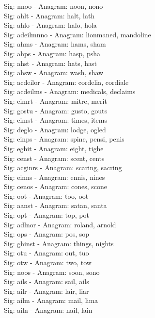 Sig: {nnoo} - Anagram: noon, nono \\
Sig: {ahlt} - Anagram: halt, lath \\
Sig: {ahlo} - Anagram: halo, hola \\
Sig: {adeilmnno} - Anagram: lionmaned, mandoline \\
Sig: {ahms} - Anagram: hams, sham \\
Sig: {ahps} - Anagram: hasp, psha \\
Sig: {ahst} - Anagram: hats, hast \\
Sig: {ahsw} - Anagram: wash, shaw \\
Sig: {acdeilor} - Anagram: cordelia, cordiale \\
Sig: {acdeilms} - Anagram: medicals, declaims \\
Sig: {eimrt} - Anagram: mitre, merit \\
Sig: {gostu} - Anagram: gusto, gouts \\
Sig: {eimst} - Anagram: times, items \\
Sig: {deglo} - Anagram: lodge, ogled \\
Sig: {einps} - Anagram: spine, pensi, penis \\
Sig: {eghit} - Anagram: eight, tighe \\
Sig: {censt} - Anagram: scent, cents \\
Sig: {acginrs} - Anagram: scaring, sacring \\
Sig: {einns} - Anagram: ennis, nines \\
Sig: {cenos} - Anagram: cones, scone \\
Sig: {oot} - Anagram: too, oot \\
Sig: {aanst} - Anagram: satan, santa \\
Sig: {opt} - Anagram: top, pot \\
Sig: {adlnor} - Anagram: roland, arnold \\
Sig: {ops} - Anagram: pos, sop \\
Sig: {ghinst} - Anagram: things, nights \\
Sig: {otu} - Anagram: out, tuo \\
Sig: {otw} - Anagram: two, tow \\
Sig: {noos} - Anagram: soon, sono \\
Sig: {ails} - Anagram: sail, ails \\
Sig: {ailr} - Anagram: lair, liar \\
Sig: {ailm} - Anagram: mail, lima \\
Sig: {ailn} - Anagram: nail, lain \\
